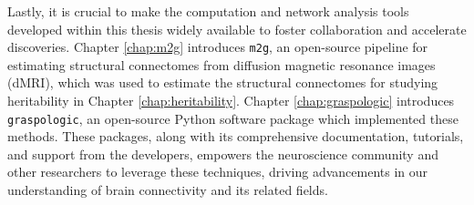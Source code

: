 Lastly, it is crucial to make the computation and network analysis tools developed within this thesis widely available to foster collaboration and accelerate discoveries. Chapter \ref{chap:m2g} introduces \texttt{m2g}, an open-source pipeline for estimating structural connectomes from diffusion magnetic resonance images (dMRI), which was used to estimate the structural connectomes for studying heritability in Chapter \ref{chap:heritability}. Chapter \ref{chap:graspologic} introduces \texttt{graspologic}, an open-source Python software package which implemented these methods. These packages, along with its comprehensive documentation, tutorials, and support from the developers, empowers the neuroscience community and other researchers to leverage these techniques, driving advancements in our understanding of brain connectivity and its related fields.

